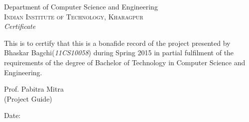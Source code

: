 \newpage
\thispagestyle{empty}

\begin{center}

\huge{Department of Computer Science and Engineering}\\[0.5cm]
\normalsize
\textsc{Indian Institute of Technology, Kharagpur}\\[2.0cm]

\emph{\LARGE Certificate}\\[2.5cm]
\end{center}
\normalsize This is to certify that this is a bonafide record of the project presented by Bhaskar Bagchi(\emph{11CS10058}) during Spring 2015 in partial fulfilment of the requirements of the degree of Bachelor of Technology in Computer Science and Engineering.\\[1.0cm]


\vfill


\begin{flushright}
Prof. Pabitra Mitra\\
(Project Guide)\\[1.5cm]
\end{flushright}

\begin{flushleft}
Date:
\end{flushleft}

